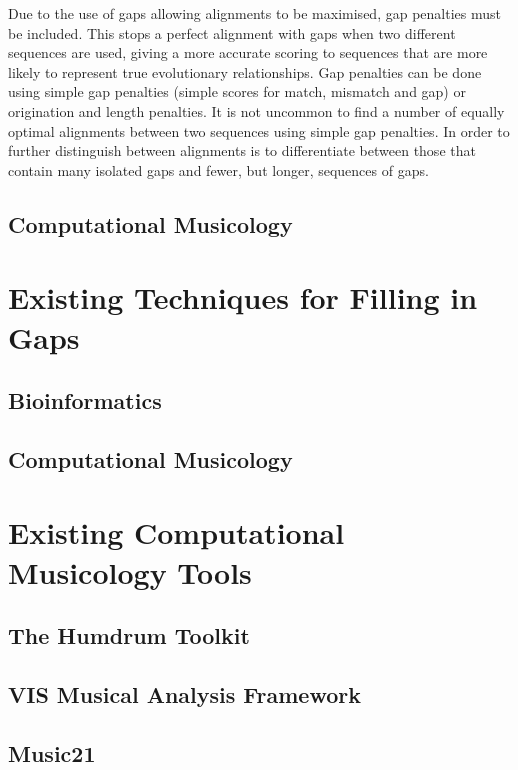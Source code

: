 Due to the use of gaps allowing alignments to be maximised, gap penalties must be included. This stops a perfect alignment with gaps when two different sequences are used, giving a more accurate scoring to sequences that are more likely to represent true evolutionary relationships. Gap penalties can be done using simple gap penalties (simple scores for match, mismatch and gap) or origination and length penalties. It is not uncommon to find a number of equally optimal alignments between two sequences using simple gap penalties. In order to further distinguish between alignments is to differentiate between those that contain many isolated gaps and fewer, but longer, sequences of gaps. 

\subsection{Computational Musicology}

\section{Existing Techniques for Filling in Gaps}

\subsection{Bioinformatics}

\subsection{Computational Musicology}

\section{Existing Computational Musicology Tools}

\subsection{The Humdrum Toolkit}

\subsection{VIS Musical Analysis Framework}

\subsection{Music21}

